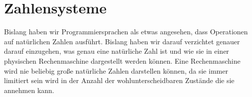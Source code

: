 \documentclass[11pt,a4paper,leqno]{report}
\newtheorem{definition}[theorem]{Definition}
\numberwithin{equation}{chapter}
\begin{document}
\chapter{Zahlensysteme}
Bislang haben wir Programmiersprachen als etwas angesehen, dass Operationen auf nat\"urlichen Zahlen ausf\"uhrt. Bislang haben wir darauf verzichtet genauer darauf einzugehen, was genau eine nat\"urliche Zahl ist und wie sie in einer physischen Rechenmaschine dargestellt werden k\"onnen.
Eine Rechenmaschine wird nie beliebig gro\ss{}e nat\"urliche Zahlen darstellen k\"onnen, da sie immer limitiert sein wird in der Anzahl der wohlunterscheidbaren Zust\"ande die sie annehmen kann.%
\end{document}

